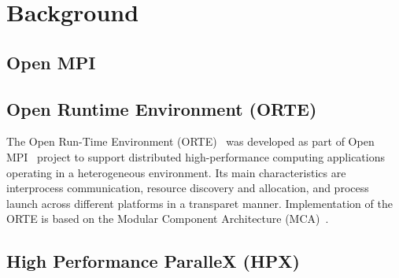 \chapter{Background}
\label{sec:Background}

\section{Open MPI}
\label{sec:Background}


\section{Open Runtime Environment (ORTE)}
\label{sec:Background}

The Open Run-Time Environment (ORTE)~\cite{Castain2008153} was developed as part of Open MPI~\cite{gabriel04:_open_mpi} project to support distributed high-performance computing applications operating in a heterogeneous environment. Its main characteristics are interprocess communication, resource discovery and allocation, and process launch across different platforms in a transparet manner. Implementation of the ORTE is based on the Modular Component Architecture (MCA)~\cite{gabriel04:_open_mpi}.


\section{High Performance ParalleX (HPX)}
\label{sec:Background}




